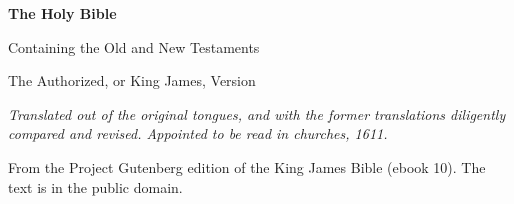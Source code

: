 \documentclass[11pt,letterpaper]{article}
\begin{document}
\color{ink}

\begin{titlepage}
\centering
\vspace*{5em}
{\LARGE\bfseries\color{heading} The Holy Bible\par}
\vspace{1.2em}
{\large Containing the Old and New Testaments\par}
\vspace{0.4em}
{\large\color{subhead} The Authorized, or King James, Version\par}
\vspace{2.5em}
{\itshape\color{subhead} Translated out of the original tongues, and with
the former translations diligently compared and revised. Appointed to be
read in churches, 1611.\par}
\vfill
{\small From the Project Gutenberg edition of the King James Bible
(ebook 10). The text is in the public domain.\par}
\vspace{2em}
\end{titlepage}

\tableofcontents


\end{document}
